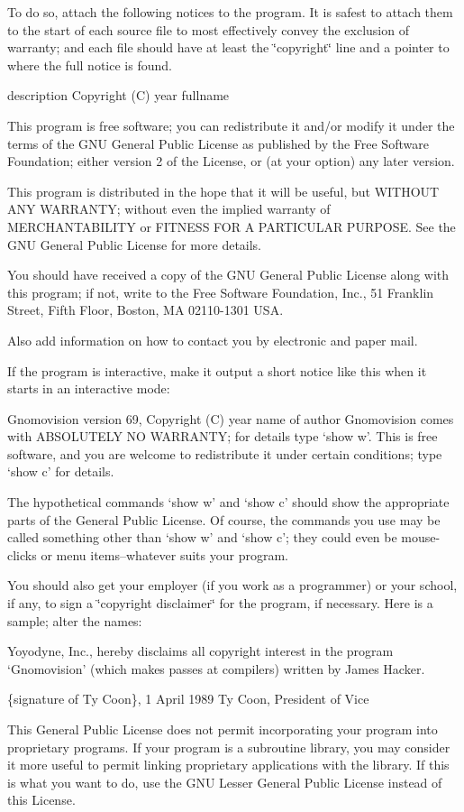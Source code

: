 To do so, attach the following notices to the program. It is safest to attach them to the start of each source file to most effectively convey the exclusion of warranty; and each file should have at least the \char`\"{}copyright\char`\"{} line and a pointer to where the full notice is found. \begin{DoxyVerb}{description}
Copyright (C) {year}  {fullname}

This program is free software; you can redistribute it and/or modify
it under the terms of the GNU General Public License as published by
the Free Software Foundation; either version 2 of the License, or
(at your option) any later version.

This program is distributed in the hope that it will be useful,
but WITHOUT ANY WARRANTY; without even the implied warranty of
MERCHANTABILITY or FITNESS FOR A PARTICULAR PURPOSE.  See the
GNU General Public License for more details.

You should have received a copy of the GNU General Public License along
with this program; if not, write to the Free Software Foundation, Inc.,
51 Franklin Street, Fifth Floor, Boston, MA 02110-1301 USA.
\end{DoxyVerb}


Also add information on how to contact you by electronic and paper mail.

If the program is interactive, make it output a short notice like this when it starts in an interactive mode\-: \begin{DoxyVerb}Gnomovision version 69, Copyright (C) year name of author
Gnomovision comes with ABSOLUTELY NO WARRANTY; for details type `show w'.
This is free software, and you are welcome to redistribute it
under certain conditions; type `show c' for details.
\end{DoxyVerb}


The hypothetical commands `show w' and `show c' should show the appropriate parts of the General Public License. Of course, the commands you use may be called something other than `show w' and `show c'; they could even be mouse-\/clicks or menu items--whatever suits your program.

You should also get your employer (if you work as a programmer) or your school, if any, to sign a \char`\"{}copyright disclaimer\char`\"{} for the program, if necessary. Here is a sample; alter the names\-:

Yoyodyne, Inc., hereby disclaims all copyright interest in the program `\-Gnomovision' (which makes passes at compilers) written by James Hacker.

\{signature of Ty Coon\}, 1 April 1989 Ty Coon, President of Vice

This General Public License does not permit incorporating your program into proprietary programs. If your program is a subroutine library, you may consider it more useful to permit linking proprietary applications with the library. If this is what you want to do, use the G\-N\-U Lesser General Public License instead of this License. 